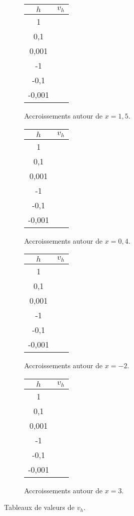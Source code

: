 \begin{figure}[h!]
	\begin{subfigure}{0.2\textwidth}
	\begin{tabular}{|c|c|}\hline
		$h$ & $v_h$ \\ \hline
		1 & \hspace{1cm} \\ \hline
		0,1 & \\ \hline
		0,001 & \\ \hline
		-1 & \\ \hline
		-0,1 & \\ \hline
		-0,001 & \\ \hline
	\end{tabular}
	\caption{Accroissements autour de $x=1,5$.}
	\label{fig:1e}
	\end{subfigure}
	\hfill
	\begin{subfigure}{0.2\textwidth}
	\begin{tabular}{|c|c|}\hline
		$h$ & $v_h$ \\ \hline
		1 & \hspace{1cm} \\ \hline
		0,1 & \\ \hline
		0,001 & \\ \hline
		-1 & \\ \hline
		-0,1 & \\ \hline
		-0,001 & \\ \hline
	\end{tabular}
	\caption{Accroissements autour de $x=0,4$.}
	\label{fig:1f}
	\end{subfigure}
	\hfill
	\begin{subfigure}{0.2\textwidth}
	\begin{tabular}{|c|c|}\hline
		$h$ & $v_h$ \\ \hline
		1 & \hspace{1cm} \\ \hline
		0,1 & \\ \hline
		0,001 & \\ \hline
		-1 & \\ \hline
		-0,1 & \\ \hline
		-0,001 & \\ \hline
	\end{tabular}
	\caption{Accroissements autour de $x=-2$.}
	\label{fig:1g}
	\end{subfigure}
	\hfill
	\begin{subfigure}{0.2\textwidth}
	\begin{tabular}{|c|c|}\hline
		$h$ & $v_h$ \\ \hline
		1 & \hspace{1cm} \\ \hline
		0,1 & \\ \hline
		0,001 & \\ \hline
		-1 & \\ \hline
		-0,1 & \\ \hline
		-0,001 & \\ \hline
	\end{tabular}
	\caption{Accroissements autour de $x=3$.}
	\label{fig:h}
	\end{subfigure}
	\caption{Tableaux de valeurs de $v_h$.}
	\label{fig:vh}
\end{figure}



